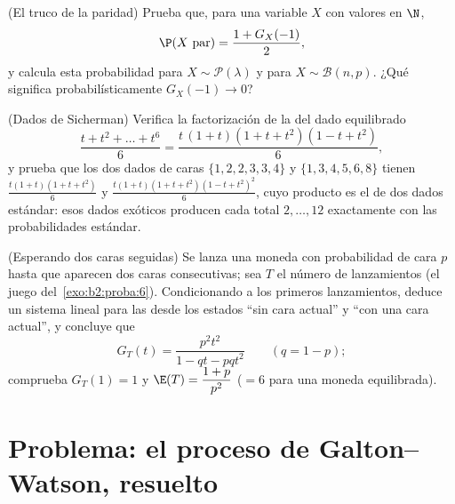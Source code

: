 \begin{exercise}[$\star$]\label{exo:b2:genfun:10}
(El truco de la paridad) Prueba que, para una variable $X$ con
valores en $\N$,
\[
\P(X \text{ par}) = \frac{1 + G_X(-1)}{2} ,
\]
y calcula esta probabilidad para $X \sim \mathcal P(\lambda)$ y para
$X \sim \mathcal B(n, p)$. ¿Qué significa probabilísticamente $G_X(-1)
\to 0$?
\end{exercise}

\begin{exercise}[$\star\star$]\label{exo:b2:genfun:11}
(Dados de Sicherman) Verifica la factorización de la
 del dado equilibrado
\[
\frac{t + t^2 + \dots + t^6}{6}
= \frac{t\,(1 + t)(1 + t + t^2)(1 - t + t^2)}{6},
\]
y prueba que los dos dados de caras $\{1, 2, 2, 3, 3, 4\}$ y $\{1, 3,
4, 5, 6, 8\}$ tienen 
$\frac{t(1+t)(1+t+t^2)}6$ y $\frac{t(1+t)(1+t+t^2)(1-t+t^2)^2}6$,
cuyo producto es el de dos dados estándar: esos dados exóticos
producen cada total $2, \dots, 12$ exactamente con las probabilidades
estándar.
\end{exercise}

\begin{exercise}[$\star\star\star$]\label{exo:b2:genfun:12}
(Esperando dos caras seguidas) Se lanza una moneda con probabilidad
de cara $p$ hasta que aparecen dos caras consecutivas; sea $T$ el
número de lanzamientos (el juego del~\cref{exo:b2:proba:6}).
Condicionando a los primeros lanzamientos, deduce un sistema lineal
para las  desde los estados ``sin cara actual''
y ``con una cara actual'', y concluye que
\[
G_T(t) = \frac{p^2t^2}{1 - qt - pqt^2}
\qquad (q = 1 - p);
\]
comprueba $G_T(1) = 1$ y $\E(T) = \dfrac{1 + p}{p^2}$ ($= 6$ para una
moneda equilibrada).
\end{exercise}

\section{Problema: el proceso de Galton--Watson, resuelto}

